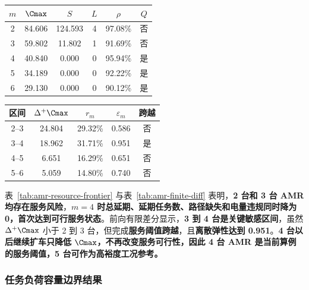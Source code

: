 \begin{center}
\footnotesize
\begin{minipage}[t]{0.50\linewidth}
\centering
{}
\label{tab:amr-resource-frontier}
\begin{tabular}{@{}cccccc@{}}
\toprule
$m$ & $\Cmax$ & $S$ & $L$ & $\rho$ & $Q$ \\
\midrule
2 & 84.606 & 124.593 & 4 & 97.08\% & 否 \\
3 & 59.802 & 11.802 & 1 & 91.69\% & 否 \\
4 & 40.840 & 0.000 & 0 & 95.94\% & 是 \\
5 & 34.189 & 0.000 & 0 & 92.22\% & 是 \\
6 & 29.130 & 0.000 & 0 & 90.12\% & 是 \\
\bottomrule
\end{tabular}
\end{minipage}\hfill
\begin{minipage}[t]{0.46\linewidth}
\centering
{}
\label{tab:amr-finite-diff}
\begin{tabular*}{\linewidth}{@{\extracolsep{\fill}}ccccc@{}}
\toprule
区间 & $\Delta^+\Cmax$ & $r_m$ & $\varepsilon_m$ & 跨越 \\
\midrule
2--3 & 24.804 & 29.32\% & 0.586 & 否 \\
3--4 & 18.962 & 31.71\% & 0.951 & 是 \\
4--5 & 6.651 & 16.29\% & 0.651 & 否 \\
5--6 & 5.059 & 14.80\% & 0.740 & 否 \\
\bottomrule
\end{tabular*}
\end{minipage}
\end{center}

表~\ref{tab:amr-resource-frontier} 与表~\ref{tab:amr-finite-diff} 表明，\textbf{2 台和 3 台 AMR 均存在服务风险}，\textbf{$m=4$ 时总延期、延期任务数、路径缺失和电量违规同时降为 0，首次达到可行服务状态}。前向有限差分显示，\textbf{3 到 4 台是关键敏感区间}，虽然 $\Delta^+\Cmax$ 小于 2 到 3 台，但完成\textbf{服务阈值跨越}，且\textbf{离散弹性达到 0.951}。\textbf{4 台以后继续扩车只降低 $\Cmax$，不再改变服务可行性，因此 4 台 AMR 是当前算例的服务阈值，5 台可作为高裕度工况参考。}

\subsubsection{任务负荷容量边界结果}

